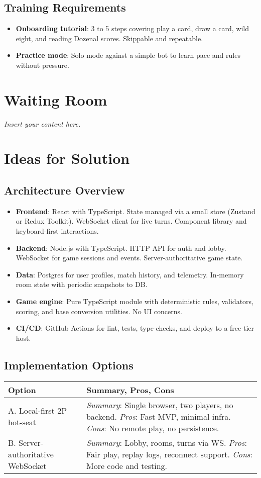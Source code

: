 \documentclass[12pt]{article}
\newcommand{\lips}{\textit{Insert your content here.}}
\begin{document}
\subsection{Training Requirements}
\begin{itemize}
  \item \textbf{Onboarding tutorial}: 3 to 5 steps covering play a card, draw a card, wild eight, and reading Dozenal scores. Skippable and repeatable.
  \item \textbf{Practice mode}: Solo mode against a simple bot to learn pace and rules without pressure.
\end{itemize}

\section{Waiting Room}
\lips

\section{Ideas for Solution}

\subsection{Architecture Overview}
\begin{itemize}
  \item \textbf{Frontend}: React with TypeScript. State managed via a small store (Zustand or Redux Toolkit). WebSocket client for live turns. Component library and keyboard-first interactions.
  \item \textbf{Backend}: Node.js with TypeScript. HTTP API for auth and lobby. WebSocket for game sessions and events. Server-authoritative game state.
  \item \textbf{Data}: Postgres for user profiles, match history, and telemetry. In-memory room state with periodic snapshots to DB.
  \item \textbf{Game engine}: Pure TypeScript module with deterministic rules, validators, scoring, and base conversion utilities. No UI concerns.
  \item \textbf{CI/CD}: GitHub Actions for lint, tests, type-checks, and deploy to a free-tier host.
\end{itemize}

\subsection{Implementation Options}
\begin{tabularx}{\textwidth}{lX}
  \toprule
  \textbf{Option} & \textbf{Summary, Pros, Cons} \\
  \midrule
  A. Local-first 2P hot-seat & \textit{Summary}: Single browser, two players, no backend. \textit{Pros}: Fast MVP, minimal infra. \textit{Cons}: No remote play, no persistence. \\
  \midrule
  B. Server-authoritative WebSocket & \textit{Summary}: Lobby, rooms, turns via WS. \textit{Pros}: Fair play, replay logs, reconnect support. \textit{Cons}: More code and testing. \\
  \midrule
\end{tabularx}
\end{document}
